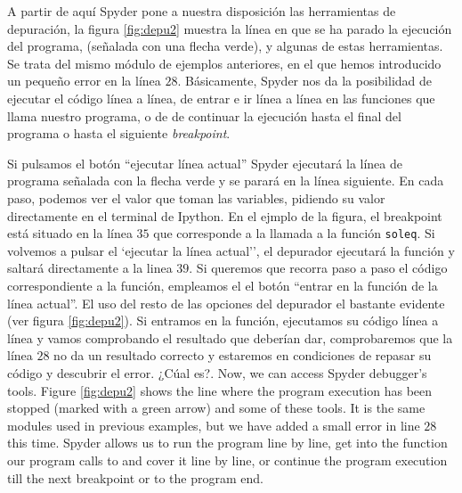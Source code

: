 \begin{paracol}{2}
A partir de aquí Spyder pone a nuestra disposición las herramientas de depuración, la figura \ref{fig:depu2} muestra la línea en que se ha parado la ejecución del programa, (señalada con una flecha verde), y algunas de estas herramientas. Se trata del mismo módulo de ejemplos anteriores, en el que hemos introducido un pequeño error en la línea $28$.  Básicamente, Spyder nos da la posibilidad de ejecutar el código línea a línea, de entrar e ir línea a línea en las funciones que llama nuestro programa, o de de continuar la ejecución hasta el final del programa o hasta el siguiente \emph{breakpoint}.

Si pulsamos el botón ``ejecutar línea actual'' Spyder ejecutará la línea de programa señalada con la flecha verde y se parará en la línea siguiente. En cada paso, podemos ver el valor que toman las variables, pidiendo su valor directamente en el terminal de Ipython. En el ejmplo de la figura, el breakpoint está situado en la línea $35$ que corresponde a la llamada a la función \texttt{soleq}. Si volvemos a pulsar el `ejecutar la línea actual'', el depurador ejecutará la función y saltará directamente a la linea $39$. Si queremos que recorra paso a paso el código correspondiente a la función, empleamos el el botón ``entrar en la función de la línea actual''. El uso del resto de las opciones del depurador el bastante evidente (ver figura \ref{fig:depu2}). Si entramos en la función, ejecutamos su código línea a línea y vamos comprobando el resultado que deberían dar, comprobaremos que la línea $28$ no da un resultado correcto y estaremos en condiciones de repasar su código y descubrir el error. ¿Cúal es?.
\switchcolumn
Now, we can access Spyder debugger's tools. Figure \ref{fig:depu2} shows the line where the program execution has been stopped (marked with a green arrow) and some of these tools. It is the same modules used in previous examples, but we have added a small error in line $28$ this time. Spyder allows us to run the program line by line, get into the function our program calls to and cover it line by line, or continue the program execution till the next breakpoint or to the program end. 


\end{paracol}
